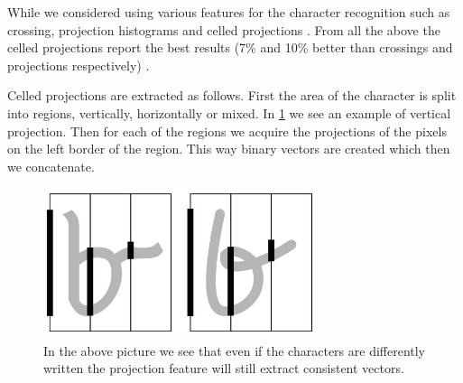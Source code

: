 While we considered using various features for the character recognition such as crossing, projection histograms and celled projections \cite{HWR:features1}\cite{HWR:features2}. From all the above the celled projections report the best results (7\% and 10\% better than crossings and projections respectively) \cite{HWR:features1}.

Celled projections are extracted as follows. First the area of the character is split into regions, vertically, horizontally or mixed. In \ref{fig:method:features:feature} we see an example of vertical projection. Then for each of the regions we acquire the projections of the pixels on the left border of the region. This way binary vectors are created which then we concatenate.

\begin{figure}[ht]
	\includegraphics[width=8cm]{shared/img/projection_letter.jpg}
	\caption{In the above picture we see that even if the characters are differently written the projection feature will still extract consistent vectors.}
	\label{fig:method:features:feature}
\end{figure}